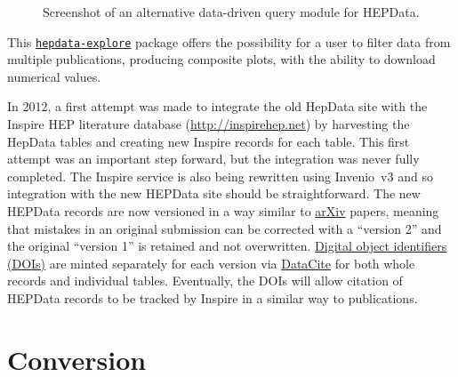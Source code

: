 \documentclass[a4paper]{jpconf}
\begin{document}
\begin{figure}
  \begin{center}
  \end{center}
  \caption{\label{fig:explore}Screenshot of an alternative data-driven query
module for HEPData.}
\end{figure}
%
This
\href{https://github.com/HEPData/hepdata-explore}{\texttt{hepdata-explore}}
package offers the possibility for a user to filter data from multiple
publications, producing composite plots, with the ability to download numerical
values.

In 2012, a first attempt was made to integrate the old HepData site with the
Inspire HEP literature database (\url{http://inspirehep.net}) by harvesting the
HepData tables and creating new Inspire records for each table.  This first
attempt was an important step forward, but the integration was never fully
completed.  The Inspire service is also being rewritten using Invenio~v3 and so
integration with the new HEPData site should be straightforward.  The new
HEPData records are now versioned in a way similar to
\href{https://arxiv.org/}{arXiv} papers, meaning that mistakes in an original
submission can be corrected with a ``version 2'' and the original ``version 1''
is retained and not overwritten.  \href{https://www.doi.org}{Digital object
identifiers (DOIs)} are minted separately for each version via
\href{https://www.datacite.org}{DataCite} for both whole records and
individual tables.  Eventually, the DOIs will allow citation of HEPData
records to be tracked by Inspire in a similar way to publications.

\section{Conversion} \label{sec:conversion}
\end{document}
